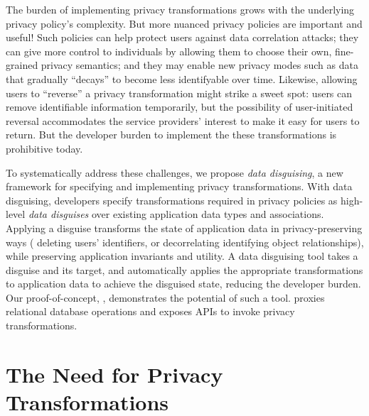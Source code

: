 %
The burden of implementing privacy transformations grows with the underlying privacy policy's
complexity.
%
But more nuanced privacy policies are important and useful!
%
Such policies can help protect users against data correlation attacks; they can give more
control to individuals by allowing them to choose their own, fine-grained privacy semantics; and
they may enable new privacy modes such as data that gradually ``decays'' to become less identifyable over time.
%
Likewise, allowing users to ``reverse'' a privacy transformation might strike a sweet spot: users
can remove identifiable information temporarily, but the possibility of user-initiated reversal
accommodates the service providers' interest to make it easy for users to return.
%
But the developer burden to implement the these transformations is prohibitive today.
%


%
To systematically address these challenges, we propose \emph{data disguising}, a new framework
for specifying and implementing privacy transformations.
%
With data disguising, developers specify transformations required in privacy policies as
high-level \emph{data disguises} over existing application data types and associations.
%
Applying a disguise transforms the state of application data in privacy-preserving ways (\eg
deleting users' identifiers, or decorrelating identifying object relationships), while preserving
application invariants and utility.
%
%
A data disguising tool takes a disguise and its target, and automatically applies the appropriate
transformations to application data to achieve the disguised state, reducing the developer burden.
%
Our proof-of-concept, \sys, demonstrates the potential of such a tool.
%
\sys proxies relational database operations and exposes APIs to invoke privacy transformations.
%

\section{The Need for Privacy Transformations}
\label{sec:survey}


